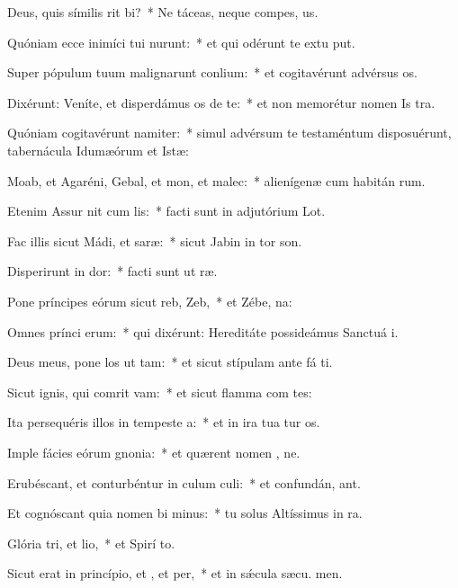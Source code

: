 \item Deus, quis símilis rit bi?~* Ne táceas, neque compes, us.
\item Quóniam ecce inimíci tui nurunt:~* et qui odérunt te extu put.
\item Super pópulum tuum malignarunt conlium:~* et cogitavérunt advérsus  os.
\item Dixérunt: Veníte, et disperdámus os de te:~* et non memorétur nomen Is tra.
\item Quóniam cogitavérunt namiter:~* simul advérsum te testaméntum disposuérunt, tabernácula Idumæórum et Istæ:
\item Moab, et Agaréni, Gebal, et mon, et malec:~* alienígenæ cum habitán rum.
\item Etenim Assur nit cum lis:~* facti sunt in adjutórium  Lot.
\item Fac illis sicut Mádi, et saræ:~* sicut Jabin in tor son.
\item Disperirunt in dor:~* facti sunt ut  ræ.
\item Pone príncipes eórum sicut reb,  Zeb,~* et Zébe,  na:
\item Omnes prínci erum:~* qui dixérunt: Hereditáte possideámus Sanctuá i.
\item Deus meus, pone los ut tam:~* et sicut stípulam ante fá ti.
\item Sicut ignis, qui comrit vam:~* et sicut flamma com tes:
\item Ita persequéris illos in tempeste a:~* et in ira tua tur os.
\item Imple fácies eórum gnonia:~* et quærent nomen , ne.
\item Erubéscant, et conturbéntur in culum culi:~* et confundán,  ant.
\item Et cognóscant quia nomen bi minus:~* tu solus Altíssimus in  ra.
\item Glória tri, et lio,~* et Spirí to.
\item Sicut erat in princípio, et , et per,~* et in sǽcula sæcu. men.

